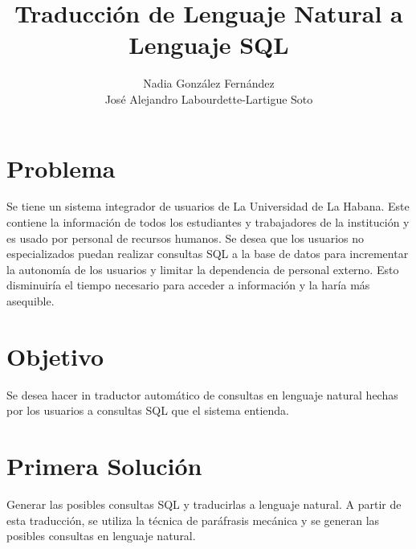 \documentclass[runningheads,a4paper]{llncs}
\begin{document}
	
	\mainmatter 
	\title{Traducción de Lenguaje Natural a Lenguaje SQL}
	\author{Nadia González Fernández \\ José Alejandro Labourdette-Lartigue Soto}
	\maketitle

	
	\section{Problema}
	Se tiene un sistema integrador de usuarios de La Universidad de La Habana. Este contiene la informaci\'on de todos los estudiantes y trabajadores de la instituci\'on y es usado por personal de recursos humanos. Se desea que los usuarios no especializados puedan realizar  consultas SQL a la base de datos para incrementar la autonom\'ia de los usuarios y limitar la dependencia de personal externo. Esto disminuir\'ia el tiempo necesario para acceder a informaci\'on y la har\'ia m\'as asequible.


	\section{Objetivo}
	Se desea hacer in traductor autom\'atico de consultas en lenguaje natural hechas por los usuarios a consultas SQL que el sistema entienda.
	
	\section{Primera Soluci\'on}
	Generar las posibles consultas SQL y traducirlas a lenguaje natural. A partir de esta traducci\'on, se utiliza la t\'ecnica de par\'afrasis mec\'anica y se generan las posibles consultas en lenguaje natural.
	
\end{document}
